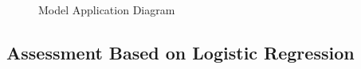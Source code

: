 \documentclass{mcmthesis}
\begin{document}
\begin{figure}[htbp]
    \centering
    \vspace{-0.15in}
    
    \begin{minipage}{1\linewidth}
        \hfill %
    \end{minipage}
    
    \vskip -0.3cm
    
    \begin{minipage}{1\linewidth}
        \hfill %
    \end{minipage}
    
    \vspace{-0.18in}
    
    \caption{Model Application Diagram} \label{fig:8-11}
\end{figure}







\subsection{Assessment Based on Logistic Regression}
\end{document}
